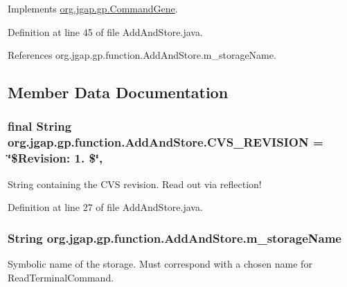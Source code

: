 Implements \hyperlink{classorg_1_1jgap_1_1gp_1_1_command_gene_a236141d99059da808afe7a9217e411c7}{org.\-jgap.\-gp.\-Command\-Gene}.



Definition at line 45 of file Add\-And\-Store.\-java.



References org.\-jgap.\-gp.\-function.\-Add\-And\-Store.\-m\-\_\-storage\-Name.



\subsection{Member Data Documentation}
\hypertarget{classorg_1_1jgap_1_1gp_1_1function_1_1_add_and_store_a48e1c2cfa0ce37278055ad74e9539b50}{
\subsubsection[{C\-V\-S\-\_\-\-R\-E\-V\-I\-S\-I\-O\-N}]{\setlength{\rightskip}{0pt plus 5cm}final String org.\-jgap.\-gp.\-function.\-Add\-And\-Store.\-C\-V\-S\-\_\-\-R\-E\-V\-I\-S\-I\-O\-N = \char`\"{}\$Revision\-: 1. \$\char`\"{}\hspace{0.3cm}{\ttfamily [static]}, {\ttfamily [private]}}}\label{classorg_1_1jgap_1_1gp_1_1function_1_1_add_and_store_a48e1c2cfa0ce37278055ad74e9539b50}
String containing the C\-V\-S revision. Read out via reflection! 

Definition at line 27 of file Add\-And\-Store.\-java.

\hypertarget{classorg_1_1jgap_1_1gp_1_1function_1_1_add_and_store_aaea25fb58b8f1efe56df91b0a37da642}{
\subsubsection[{m\-\_\-storage\-Name}]{\setlength{\rightskip}{0pt plus 5cm}String org.\-jgap.\-gp.\-function.\-Add\-And\-Store.\-m\-\_\-storage\-Name\hspace{0.3cm}{\ttfamily [private]}}}\label{classorg_1_1jgap_1_1gp_1_1function_1_1_add_and_store_aaea25fb58b8f1efe56df91b0a37da642}
Symbolic name of the storage. Must correspond with a chosen name for Read\-Terminal\-Command. 

